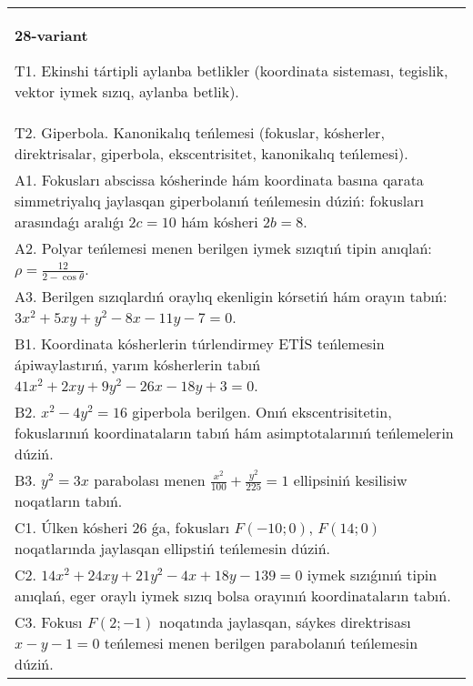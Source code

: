 \documentclass{article}
\begin{document}
\begin{tabular}{m{17cm}}
\textbf{28-variant}
\newline

T1. Ekinshi tártipli aylanba betlikler (koordinata sisteması, tegislik, vektor iymek sızıq, aylanba betlik).\\

T2. Giperbola. Kanonikalıq teńlemesi (fokuslar, kósherler, direktrisalar, giperbola, ekscentrisitet, kanonikalıq teńlemesi).\\

A1. Fokusları abscissa kósherinde hám koordinata basına qarata simmetriyalıq jaylasqan giperbolanıń teńlemesin dúziń: fokusları arasındaǵı aralıǵı $2 c=10$ hám kósheri $2 b=8$.\\

A2. Polyar teńlemesi menen berilgen iymek sızıqtıń tipin anıqlań: $\rho=\frac{12}{2-\cos\theta}$.\\

A3. Berilgen sızıqlardıń oraylıq ekenligin kórsetiń hám orayın tabıń: $3 x^{2}+5 xy+y^{2}-8 x-11 y-7=0$.\\

B1. Koordinata kósherlerin túrlendirmey ETİS teńlemesin ápiwaylastırıń, yarım kósherlerin tabıń $41x^{2} + 2xy + 9y^{2} - 26x - 18y + 3 = 0$.  \\

B2. $x^{2} - 4y^{2} = 16$ giperbola berilgen. Onıń ekscentrisitetin, fokuslarınıń koordinataların tabıń hám asimptotalarınıń teńlemelerin dúziń.\\

B3. $y^{2} = 3x$ parabolası menen $\frac{x^{2}}{100} + \frac{y^{2}}{225} = 1$ ellipsiniń kesilisiw noqatların tabıń.  \\

C1. Úlken kósheri 26 ǵa, fokusları $F( - 10;0)$, $F(14;0)$ noqatlarında jaylasqan ellipstiń teńlemesin dúziń.  \\

C2. $14x^{2} + 24xy + 21y^{2} - 4x + 18y - 139 = 0$ iymek sızıǵınıń tipin anıqlań, eger oraylı iymek sızıq bolsa orayınıń koordinataların tabıń.  \\

C3. Fokusı $F(2; - 1)$ noqatında jaylasqan, sáykes direktrisası $x - y - 1 = 0$ teńlemesi menen berilgen parabolanıń teńlemesin dúziń.  \\

\end{tabular}
\vspace{1cm}
\end{document}
